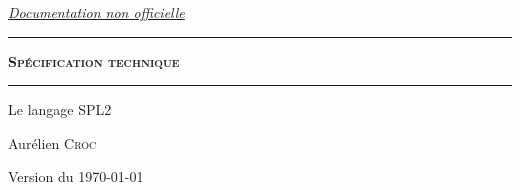 \thispagestyle{empty}
\begin{center}
\underline{\emph{Documentation non officielle}}
\vspace{3cm}

\rule{10cm}{0.1pt}
\vspace{0.3cm}

\begin{huge}\textbf{\textsc{Spécification technique}}\end{huge}
\rule{10cm}{0.1pt}
\vspace{4cm}

\begin{Huge}Le langage SPL2\end{Huge}
\vspace{8.5cm}

\begin{Large}Aurélien \textsc{Croc}\end{Large}

Version \version{} du \today{}

\end{center}
\newpage
